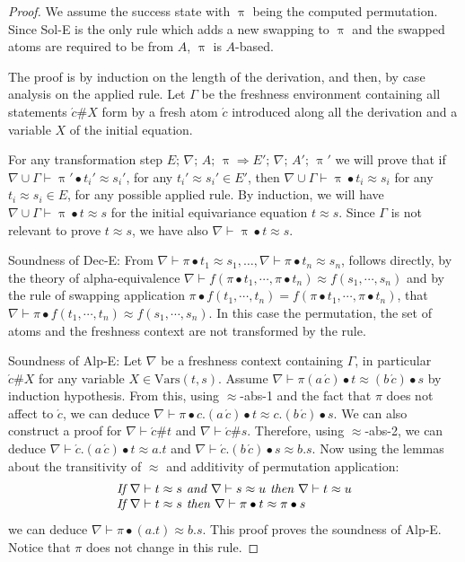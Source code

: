 \documentclass{llncs}
\newcommand{\Lra}{\Longrightarrow}
\newcommand{\vars}{\mathrm{Vars}}
\newcommand{\perm}{\approx}
\newcommand{\permef}{\bullet}
\newcommand\ppi{\uppi}
\newcommand{\fresh}[1]{{\acute{#1}}}
\newcommand{\Atoms}{A}
\newcommand{\nablai}{{\nabla}}
\begin{document}
\begin{proof}
We assume the success state with $\ppi$ being the computed
permutation.  Since {\sf Sol-E} is the only rule which adds a new
swapping to $\ppi$ and the swapped atoms are required to be from
$\Atoms$, $\ppi$ is $\Atoms$-based.

The proof is by induction on the length of the derivation, and then,
by case analysis on the applied rule. Let $\Gamma$ be the freshness
environment containing all statements $\fresh{c}\#X$ form by a fresh atom
$\fresh{c}$ introduced along all the derivation and a variable $X$ of the
initial equation.

For any transformation step $ E ;\,\allowbreak \nablai ;\,\allowbreak
\Atoms ;\,\allowbreak \ppi \Lra E' ;\, \nablai;\, \Atoms' ;\, \ppi'$
we will prove that if $\nablai\cup\Gamma\vdash\ppi'\permef t_i'\approx
s_i'$, for any $t_i'\perm s_i'\in E'$, then
$\nablai\cup\Gamma\vdash\ppi\permef t_i\approx s_i$ for any $t_i\perm
s_i\in E$, for any possible applied rule. By induction, we will have
$\nablai\cup\Gamma\vdash\ppi\permef t\approx s$ for the initial
equivariance equation $t\perm s$.  Since $\Gamma$ is not relevant to
prove $t\approx s$, we have also $\nablai\vdash\ppi\permef t\approx
s$.

Soundness of {\sf Dec-E}: From $\nablai\vdash
\pi\permef t_1\approx s_1,\dots, \nablai\vdash \pi\permef t_n\approx
s_n$, follows directly, by the theory of alpha-equivalence
$\nablai\vdash f(\pi\permef t_1,\cdots,\pi\permef t_n) \approx
f(s_1,\cdots,s_n)$ and by the rule of swapping application
$\pi\permef f(t_1,\cdots,t_n)=f(\pi\permef t_1,\cdots,\pi\permef
t_n)$, that $\nablai\vdash \pi\permef f(t_1,\cdots,t_n) \approx
f(s_1,\cdots,s_n)$. In this case the permutation, the set of atoms and
the freshness context are not transformed by the rule.

Soundness of {\sf Alp-E}:  Let $\nabla$ be a
freshness context containing $\Gamma$, in particular $\fresh{c}\#X$
for any variable $X\in\vars(t,s)$. Assume $\nabla\vdash \pi(a\,
\fresh{c})\permef t \approx (b\, \fresh{c})\permef s$ by induction
hypothesis. From this, using $\approx$-abs-1 and the fact that $\pi$
does not affect to $\fresh{c}$, we can deduce $\nabla\vdash\pi\permef
c.(a\, \fresh{c})\permef t \approx c.(b\, \fresh{c})\permef s$.  We
can also construct a proof for $\nabla\vdash \fresh{c}\# t$ and
$\nabla\vdash\fresh{c}\# s$.  Therefore, using $\approx$-abs-2, we can
deduce $\nabla\vdash \fresh{c}.(a\, \fresh{c})\permef t \approx a.t$
and $\nabla\vdash \fresh{c}.(b\, \fresh{c})\permef s \approx b.s$.
Now using the lemmas about the transitivity of $\approx$ and additivity
of permutation application:
$$
\begin{array}{l}
\mbox{\it If $\nabla\vdash t\approx s$ and $\nabla\vdash s\approx u$ then $\nabla\vdash t\approx u$}\\
\mbox{\it If $\nabla\vdash t\approx s$ then $\nabla\vdash \pi\permef t\approx \pi\permef s$}
\end{array}
$$ 
we can deduce $\nabla\vdash \pi\permef (a.t) \approx b.s$.  This
proof proves the soundness of {\sf Alp-E}. Notice that $\pi$ does not
change in this rule.


\end{proof}
\end{document}
